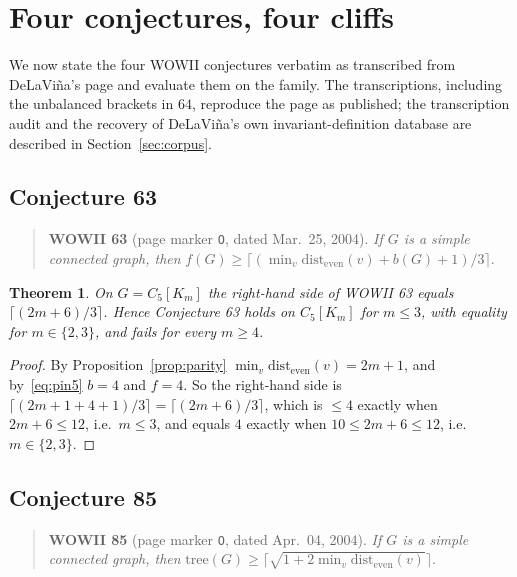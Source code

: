 \documentclass[10pt,a4paper]{article}
\theoremstyle{plain}
\newtheorem{theorem}{Theorem}[section]
\theoremstyle{definition}
\newcommand{\forestnum}{f}
\newcommand{\bipnum}{b}
\newcommand{\treenum}{\mathrm{tree}}
\newcommand{\de}{\mathrm{dist_{even}}}
\newcommand{\blow}[2]{#1[K_{#2}]}
\begin{document}
\section{Four conjectures, four cliffs}\label{sec:cliff}

We now state the four WOWII conjectures verbatim as transcribed from DeLaVi\~na's page
\cite{wowii} and evaluate them on the family. The transcriptions, including the unbalanced
brackets in $64$, reproduce the page as published; the transcription audit and the recovery of
DeLaVi\~na's own invariant-definition database are described in Section~\ref{sec:corpus}.

\subsection{Conjecture 63}

\begin{quote}
\textbf{WOWII 63} (page marker \texttt{O}, dated Mar.\ 25, 2004). \emph{If $G$ is a simple
connected graph, then}
$\forestnum(G) \ge \big\lceil (\min_v \de(v) + \bipnum(G) + 1)/3 \big\rceil$.
\end{quote}

\begin{theorem}\label{thm:63}
On $G = \blow{C_5}{m}$ the right-hand side of WOWII 63 equals
$\lceil (2m+6)/3 \rceil$. Hence Conjecture 63 holds on $\blow{C_5}{m}$ for $m \le 3$, with
equality for $m \in \{2,3\}$, and fails for every $m \ge 4$.
\end{theorem}

\begin{proof}
By Proposition~\ref{prop:parity} $\min_v \de(v) = 2m+1$, and by~\eqref{eq:pin5}
$\bipnum = 4$ and $\forestnum = 4$. So the right-hand side is
$\lceil (2m+1+4+1)/3\rceil = \lceil (2m+6)/3 \rceil$, which is $\le 4$ exactly when
$2m + 6 \le 12$, i.e.\ $m \le 3$, and equals $4$ exactly when $10 \le 2m+6 \le 12$, i.e.\
$m \in \{2,3\}$.
\end{proof}

\subsection{Conjecture 85}

\begin{quote}
\textbf{WOWII 85} (page marker \texttt{O}, dated Apr.\ 04, 2004). \emph{If $G$ is a simple
connected graph, then} $\treenum(G) \ge \big\lceil \sqrt{1 + 2\min_v \de(v)} \big\rceil$.
\end{quote}
\end{document}
